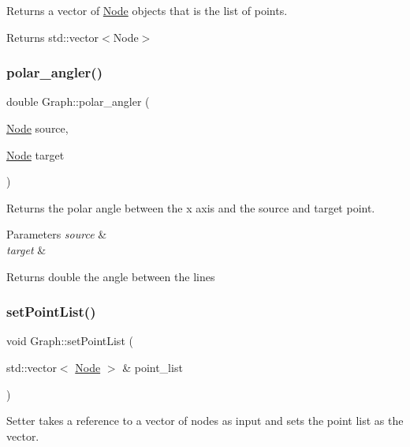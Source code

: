 Returns a vector of \hyperlink{classNode}{Node} objects that is the list of points. 

\begin{DoxyReturn}{Returns}
std\+::vector$<$\+Node$>$ 
\end{DoxyReturn}
\mbox{\label{classGraph_af62998005ee35671342b379af7400b1b}} 
\subsubsection{\texorpdfstring{polar\+\_\+angler()}{polar\_angler()}}
{\footnotesize\ttfamily double Graph\+::polar\+\_\+angler (\begin{DoxyParamCaption}\item[{\hyperlink{classNode}{Node}}]{source,  }\item[{\hyperlink{classNode}{Node}}]{target }\end{DoxyParamCaption})}



Returns the polar angle between the x axis and the source and target point. 


\begin{DoxyParams}{Parameters}
{\em source} & \\
\hline
{\em target} & \\
\hline
\end{DoxyParams}
\begin{DoxyReturn}{Returns}
double the angle between the lines 
\end{DoxyReturn}
\mbox{\label{classGraph_ac3d8fd4be7db3fd814b68499322b9cba}} 
\subsubsection{\texorpdfstring{set\+Point\+List()}{setPointList()}}
{\footnotesize\ttfamily void Graph\+::set\+Point\+List (\begin{DoxyParamCaption}\item[{std\+::vector$<$ \hyperlink{classNode}{Node} $>$ \&}]{point\+\_\+list }\end{DoxyParamCaption})}



Setter takes a reference to a vector of nodes as input and sets the point list as the vector. 


